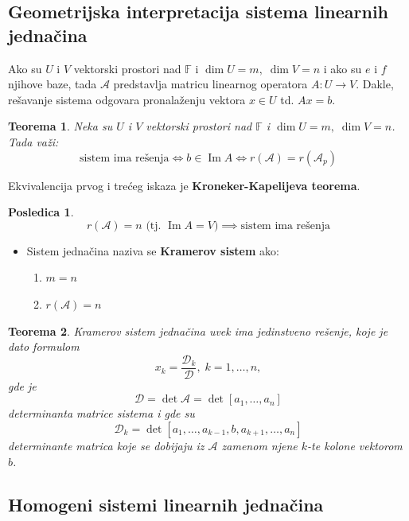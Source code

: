 \documentclass[a4paper,12pt,twoside]{report}
\newtheorem{theorem}{Teorema}[section]
\newtheorem{corollary}{Posledica}[theorem]
\numberwithin{algorithm}{section}
\begin{document}
\subsection{Geometrijska interpretacija sistema linearnih jednačina}

Ako su $U$ i $V$ vektorski prostori nad $\mathbb{F}$ i $\dim U = m, \; \dim V = n$ i ako su $e$ i $f$ njihove baze, tada $\mathcal{A}$ predstavlja matricu linearnog
operatora $A: U \to V$. Dakle, rešavanje sistema odgovara pronalaženju vektora $x \in U$ td. $Ax = b$.

\begin{theorem}
    Neka su $U$ i $V$ vektorski prostori nad $\mathbb{F}$ i $\dim U = m, \; \dim V = n$. Tada važi:
    \[ \text{sistem ima rešenja} \iff b \in \operatorname{Im} A \iff r(\mathcal{A}) = r(\mathcal{A}_p) \]
\end{theorem}
\noindent Ekvivalencija prvog i trećeg iskaza je \textbf{Kroneker-Kapelijeva teorema}.\\


\begin{corollary}
    \[ r(\mathcal{A}) = n \text{ (tj. $\operatorname{Im} A = V$)} \implies \text{sistem ima rešenja} \]
\end{corollary}

\begin{itemize}
    \item Sistem jednačina naziva se \textbf{Kramerov sistem} ako:
\begin{enumerate}
    \item $m=n$
    \item $r(\mathcal{A}) = n$
\end{enumerate}
\end{itemize}

\begin{theorem}
    Kramerov sistem jednačina uvek ima jedinstveno rešenje, koje je dato formulom
    \[ x_k = \frac{\mathcal{D}_k}{\mathcal{D}}, \; k = 1, \dots, n,  \]
    gde je \[\mathcal{D} = \det \mathcal{A} = \det [a_1, \dots, a_n]\] determinanta matrice sistema i gde su \[\mathcal{D}_k = \det[a_1, \dots, a_{k-1}, b, a_{k+1}, \dots, a_n]\]
    determinante matrica koje se dobijaju iz $\mathcal{A}$ zamenom njene $k$-te kolone vektorom $b$.
\end{theorem}

\subsection{Homogeni sistemi linearnih jednačina}
\end{document}

